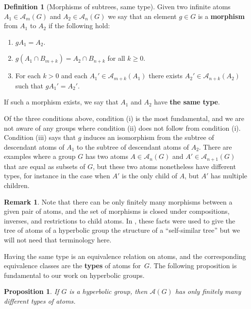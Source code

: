 \documentclass[11pt,letterpaper]{amsart}
\newtheorem{proposition}[theorem]{Proposition}
\theoremstyle{definition}
\newtheorem{definition}[theorem]{Definition}
\newtheorem{remark}[theorem]{Remark}
\newcommand{\newword}[1]{\textbf{#1}}
\newcommand{\A}{\mathcal{A}}
\begin{document}
\begin{definition}[Morphisms of subtrees, same type]\label{def:morphisms}
Given two infinite atoms $A_1\in \A_m(G)$ and $A_2\in \A_n(G)$ we say that an element $g\in G$ is a \newword{morphism} from $A_1$ to $A_2$ if the following hold:
\begin{enumerate}
    \item $gA_1=A_2$.\smallskip
    \item $g(A_1\cap B_{m+k}) = A_2\cap B_{n+k}$ for all $k\geq 0$.\smallskip
    \item For each $k>0$ and each $A_1'\in \A_{m+k}(A_1)$ there exists $A_2'\in \A_{n+k}(A_2)$ such that $gA_1'=A_2'$.
\end{enumerate}
If such a morphism exists, we say that $A_1$ and $A_2$ have \newword{the same type}.
\end{definition}

Of the three conditions above, condition (i) is the most fundamental, and we are not aware of any groups where condition (ii) does not follow from condition (i).  Condition (iii) says that $g$ induces an isomorphism from the subtree of descendant atoms of $A_1$ to the subtree of descendant atoms of $A_2$.  There are examples where a group $G$ has two atoms $A\in \A_n(G)$ and $A'\in \A_{n+1}(G)$ that are equal as subsets of $G$, but these two atoms nonetheless have different types, for instance in the case when $A'$ is the only child of $A$, but $A'$ has multiple children.

\begin{remark}\label{rem:SelfSimilarTree}
Note that there can be only finitely many morphisms between a given pair of atoms, and the set of morphisms is closed under compositions, inverses, and restrictions to child atoms. In \cite{BelkBleakMatucci}, these facts were used to give the tree of atoms of a hyperbolic group the structure of a ``self-similar tree'' but we will not need that terminology here.
\end{remark}

Having the same type is an equivalence relation on atoms, and the corresponding equivalence classes are the \newword{types} of atoms for~$G$.  The following proposition is fundamental to our work on hyperbolic groups.

\begin{proposition}\cite[Corollary~3.28]{BelkBleakMatucci}\label{prop:fin_many_types}
If $G$ is a hyperbolic group, then $\A(G)$ has only finitely many different types of atoms.
\end{proposition}
\end{document}
